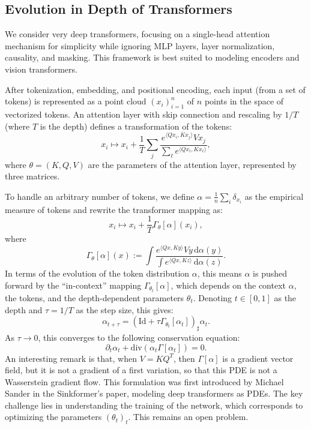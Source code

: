 \subsection{Evolution in Depth of Transformers}

We consider very deep transformers, focusing on a single-head attention mechanism for simplicity while ignoring MLP layers, layer normalization, causality, and masking. This framework is best suited to modeling encoders and vision transformers. 

After tokenization, embedding, and positional encoding, each input (from a set of tokens) is represented as a point cloud $(x_i)_{i=1}^n$ of $n$ points in the space of vectorized tokens. An attention layer with skip connection and rescaling by $1/T$ (where $T$ is the depth) defines a transformation of the tokens:
\begin{equation}
    x_i \mapsto x_i + \frac{1}{T} \sum_j \frac{e^{\langle Q x_i, K x_j \rangle} V x_j}{\sum_{\ell} e^{\langle Q x_i, K x_\ell \rangle}},
\end{equation}
where $\theta = (K, Q, V)$ are the parameters of the attention layer, represented by three matrices.

To handle an arbitrary number of tokens, we define $\alpha = \frac{1}{n} \sum_i \delta_{x_i}$ as the empirical measure of tokens and rewrite the transformer mapping as:
\begin{equation}
    x_i \mapsto x_i + \frac{1}{T} \Gamma_\theta[\alpha](x_i),
\end{equation}
where
\begin{equation}
    \Gamma_\theta[\alpha](x) := \int \frac{e^{\langle Q x, K y \rangle} V y \, \mathrm{d} \alpha(y)}{\int e^{\langle Q x, K z \rangle} \, \mathrm{d} \alpha(z)}.
\end{equation}
In terms of the evolution of the token distribution $\alpha$, this means $\alpha$ is pushed forward by the ``in-context'' mapping $\Gamma_{\theta_t}[\alpha]$, which depends on the context $\alpha$, the tokens, and the depth-dependent parameters $\theta_t$. Denoting $t \in [0, 1]$ as the depth and $\tau = 1/T$ as the step size, this gives:
\begin{equation}
    \alpha_{t+\tau} = (\mathrm{Id} + \tau \Gamma_{\theta_t}[\alpha_t])_\sharp \alpha_t.
\end{equation}
As $\tau \to 0$, this converges to the following conservation equation:
\begin{equation}
    \partial_t \alpha_t + \mathrm{div}(\alpha_t \Gamma[\alpha_t]) = 0.
\end{equation}
An interesting remark is that, when $V=KQ^T$, then $\Gamma[\alpha]$ is a gradient vector field, but it is not a gradient of a first variation, so that this PDE is not a Wasserstein gradient flow. 
%
This formulation was first introduced by Michael Sander in the Sinkformer's paper, modeling deep transformers as PDEs. The key challenge lies in understanding the training of the network, which corresponds to optimizing the parameters $(\theta_t)_t$. This remains an open problem.


